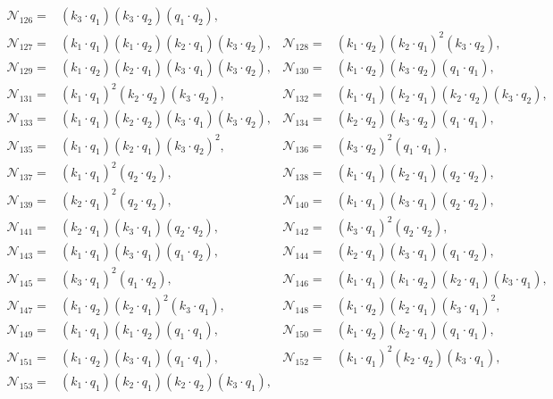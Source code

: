 \documentclass[twocolumn,aps,showpacs,nofootinbib,superscriptaddress,prd]{revtex4-2}
\begin{document}
\begin{widetext}
\begin{align}
{\mathcal N}_{126}=&(k_3\cdot q_1) (k_3\cdot q_2) (q_1\cdot q_2),\nonumber\\
{\mathcal N}_{127}=&(k_1\cdot q_1) (k_1\cdot q_2) (k_2\cdot q_1) (k_3\cdot q_2),&
{\mathcal N}_{128}=&(k_1\cdot q_2) (k_2\cdot q_1)^2 (k_3\cdot q_2),\nonumber\\
{\mathcal N}_{129}=&(k_1\cdot q_2) (k_2\cdot q_1) (k_3\cdot q_1) (k_3\cdot q_2),&
{\mathcal N}_{130}=&(k_1\cdot q_2) (k_3\cdot q_2) (q_1\cdot q_1),\nonumber\\
{\mathcal N}_{131}=&(k_1\cdot q_1)^2 (k_2\cdot q_2) (k_3\cdot q_2),&
{\mathcal N}_{132}=&(k_1\cdot q_1) (k_2\cdot q_1) (k_2\cdot q_2) (k_3\cdot q_2),\nonumber\\
{\mathcal N}_{133}=&(k_1\cdot q_1) (k_2\cdot q_2) (k_3\cdot q_1) (k_3\cdot q_2),&
{\mathcal N}_{134}=&(k_2\cdot q_2) (k_3\cdot q_2) (q_1\cdot q_1),\nonumber\\
{\mathcal N}_{135}=&(k_1\cdot q_1) (k_2\cdot q_1) (k_3\cdot q_2)^2,&
{\mathcal N}_{136}=&(k_3\cdot q_2)^2 (q_1\cdot q_1),\nonumber\\
{\mathcal N}_{137}=&(k_1\cdot q_1)^2 (q_2\cdot q_2),&
{\mathcal N}_{138}=&(k_1\cdot q_1) (k_2\cdot q_1) (q_2\cdot q_2),\nonumber\\
{\mathcal N}_{139}=&(k_2\cdot q_1)^2 (q_2\cdot q_2),&
{\mathcal N}_{140}=&(k_1\cdot q_1) (k_3\cdot q_1) (q_2\cdot q_2),\nonumber\\
{\mathcal N}_{141}=&(k_2\cdot q_1) (k_3\cdot q_1) (q_2\cdot q_2),&
{\mathcal N}_{142}=&(k_3\cdot q_1)^2 (q_2\cdot q_2),\nonumber\\
{\mathcal N}_{143}=&(k_1\cdot q_1) (k_3\cdot q_1) (q_1\cdot q_2),&
{\mathcal N}_{144}=&(k_2\cdot q_1) (k_3\cdot q_1) (q_1\cdot q_2),\nonumber\\
{\mathcal N}_{145}=&(k_3\cdot q_1)^2 (q_1\cdot q_2),&
{\mathcal N}_{146}=&(k_1\cdot q_1) (k_1\cdot q_2) (k_2\cdot q_1) (k_3\cdot q_1),\nonumber\\
{\mathcal N}_{147}=&(k_1\cdot q_2) (k_2\cdot q_1)^2 (k_3\cdot q_1),&
{\mathcal N}_{148}=&(k_1\cdot q_2) (k_2\cdot q_1) (k_3\cdot q_1)^2,\nonumber\\
{\mathcal N}_{149}=&(k_1\cdot q_1) (k_1\cdot q_2) (q_1\cdot q_1),&
{\mathcal N}_{150}=&(k_1\cdot q_2) (k_2\cdot q_1) (q_1\cdot q_1),\nonumber\\
{\mathcal N}_{151}=&(k_1\cdot q_2) (k_3\cdot q_1) (q_1\cdot q_1),&
{\mathcal N}_{152}=&(k_1\cdot q_1)^2 (k_2\cdot q_2) (k_3\cdot q_1),\nonumber\\
{\mathcal N}_{153}=&(k_1\cdot q_1) (k_2\cdot q_1) (k_2\cdot q_2) (k_3\cdot q_1),&

\end{align}
\end{widetext}
\end{document}
